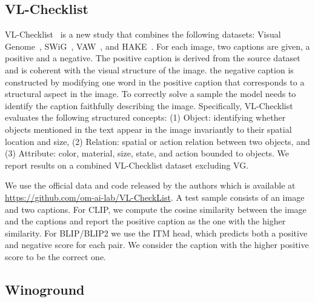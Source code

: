 \documentclass[11pt]{article}
\newcommand{\minisection}[1]{\noindent{\textbf{#1}.}}
\begin{document}
\subsection{VL-Checklist}
\minisection{Dataset} VL-Checklist~\cite{vlc} is a new study that combines the following datasets: Visual Genome~\cite{krishna2017visual}, SWiG~\cite{swig}, VAW~\cite{vaw}, and HAKE~\cite{hake}. For each image, two captions are given, a positive and a negative. The positive caption is derived from the source dataset and is coherent with the visual structure of the image. the negative caption is constructed by modifying one word in the positive caption that corresponds to a structural aspect in the image. To correctly solve a sample the model needs to identify the caption faithfully describing the image. Specifically, VL-Checklist evaluates the following structured concepts: (1) Object: identifying whether objects mentioned in the text appear in the image invariantly to their spatial location and size, (2) Relation: spatial or action relation between two objects, and (3) Attribute: color, material, size, state, and action bounded to objects. We report results on a combined VL-Checklist dataset excluding VG.
\label{supp:impl:vl}








\minisection{Inference details} We use the official data and code released by the authors which is available at \url{https://github.com/om-ai-lab/VL-CheckList}.  A test sample consists of an image and two captions. For CLIP, we compute the cosine similarity between the image and the captions and report the positive caption as the one with the higher similarity. For BLIP/BLIP2 we use the ITM head, which predicts both a positive and negative score for each pair. We consider the caption with the higher positive score to be the correct one.




\subsection{Winoground}
\label{supp:impl:wino}
\end{document}

